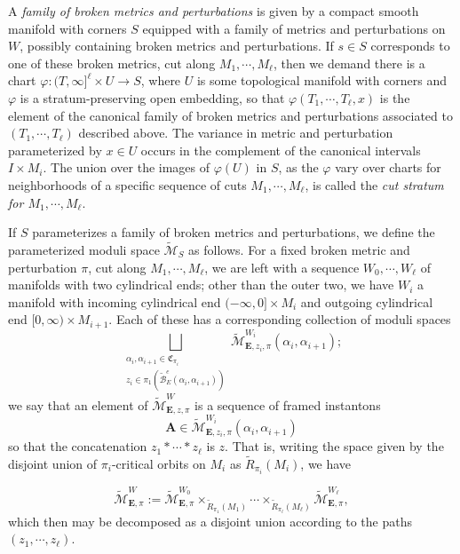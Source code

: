 \documentclass{memo-l}
\theoremstyle{definition}
\theoremstyle{remark}
\numberwithin{section}{chapter}
\numberwithin{equation}{chapter}
\begin{document}
A \emph{family of broken metrics and perturbations} is given by a compact smooth manifold with corners $S$ equipped with a family of metrics and perturbations on $W$, possibly containing broken metrics and perturbations. If $s \in S$ corresponds to one of these broken metrics, cut along $M_1, \cdots, M_\ell$, then we demand there is a chart $\varphi: (T, \infty]^\ell \times U \to S$, where $U$ is some topological manifold with corners and $\varphi$ is a stratum-preserving open embedding, so that $\varphi(T_1, \cdots, T_\ell, x)$ is the element of the canonical family of broken metrics and perturbations associated to $(T_1, \cdots, T_\ell)$ described above. The variance in metric and perturbation parameterized by $x \in U$ occurs in the complement of the canonical intervals $I \times M_i$. The union over the images of $\varphi(U)$ in $S$, as the $\varphi$ vary over charts for neighborhoods of a specific sequence of cuts $M_1, \cdots, M_\ell$, is called the \emph{cut stratum for $M_1, \cdots, M_\ell$}.

If $S$ parameterizes a family of broken metrics and perturbations, we define the parameterized moduli space $\widetilde{\mathcal M}_S$ as follows. For a fixed broken metric and perturbation $\pi$, cut along $M_1, \cdots, M_\ell$, we are left with a sequence $W_0, \cdots, W_\ell$ of manifolds with two cylindrical ends; other than the outer two, we have $W_i$ a manifold with incoming cylindrical end $(-\infty, 0] \times M_i$ and outgoing cylindrical end $[0,\infty)\times M_{i+1}$. Each of these has a corresponding collection of moduli spaces $$\bigsqcup_{\substack{\alpha_i, \alpha_{i+1} \in \mathfrak C_{\pi_i}\\ z_i \in \pi_1(\widetilde{\mathcal B}^e_E(\alpha_i, \alpha_{i+1}))}}\widetilde{\mathcal M}^{W_i}_{\mathbf{E},z_i,\pi}(\alpha_i, \alpha_{i+1});$$ we say that an element of $\widetilde{\mathcal M}^W_{\mathbf{E},z,\pi}$ is a sequence of framed instantons
$$\mathbf{A} \in \widetilde{\mathcal M}^{W_i}_{\mathbf{E},z_i,\pi}(\alpha_i, \alpha_{i+1})$$
so that the concatenation $z_1 * \cdots * z_\ell$ is $z$. That is, writing the space given by the disjoint union of $\pi_i$-critical orbits on $M_i$ as $\widetilde R_{\pi_i}(M_i)$, we have

$$\widetilde{\mathcal M}^W_{\mathbf{E},\pi} := \widetilde{\mathcal M}^{W_0}_{\mathbf{E},\pi} \times_{\widetilde R_{\pi_1}(M_1)} \cdots \times_{\widetilde R_{\pi_\ell}(M_\ell)} \widetilde{\mathcal M}^{W_\ell}_{\mathbf{E},\pi},$$
which then may be decomposed as a disjoint union according to the paths $(z_1, \cdots, z_\ell)$.
\end{document}
